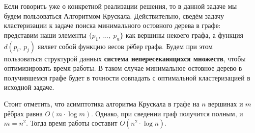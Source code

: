 \documentclass[a4paper,12pt]{article}
\begin{document}
Если говорить уже о конкретной реализации решения, то в данной задаче мы будем пользоваться $\textbf{Алгоритмом Крускала}$. Действительно, сведём задачу кластеризации к задаче поиска минимального остовного дерева в графе: представим наши элементы $\{p_1,\ \ldots,\ p_n\}$ как вершины некоего графа, а функция $d(p_i,\ p_j)$ являет собой функцию весов рёбер графа. Будем при этом пользоваться структурой данных \textbf{система непересекающихся множеств}, чтобы оптимизировать время работы. В таком случае минимальное остовное дерево в получившемся графе будет в точности совпадать с оптимальной кластеризацией в исходной задаче.

Стоит отметить, что асимптотика алгоритма Крускала в графе на $n$ вершинах и $m$ рёбрах равна $O(m \cdot \log m)$. Однако, при сведении граф получится полным, и $m = n^2$. Тогда время работы составит $O(n^2 \cdot \log n)$.
\end{document}
